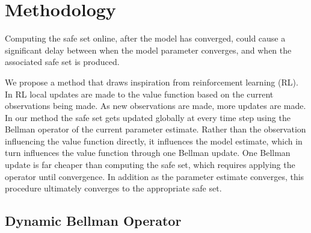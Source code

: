 \documentclass{journal}
\begin{document}
\section{Methodology}
Computing the safe set online, after the model has converged, could cause a significant delay between when the model parameter converges, and when the associated safe set is produced. 

We propose a method that draws inspiration from reinforcement learning (RL). In RL local updates are made to the value function based on the current observations being made. As new observations are made, more updates are made. In our method the safe set gets updated globally at every time step using the Bellman operator of the current parameter estimate. Rather than the observation influencing the value function directly, it influences the model estimate, which in turn influences the value function through one Bellman update. One Bellman update is far cheaper than computing the safe set, which requires applying the operator until convergence. In addition as the parameter estimate converges, this procedure ultimately converges to the appropriate safe set.   

\subsection{Dynamic Bellman Operator}

%
%
\end{document}
